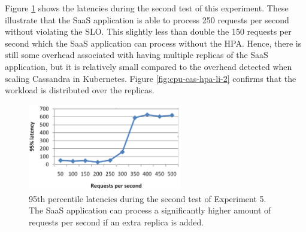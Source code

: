 \newpage

Figure \ref{fig:lat-saas-hpa-li} shows the latencies during the second test of this experiment. These illustrate that the SaaS application is able to process 250 requests per second without violating the SLO. This slightly less than double the 150 requests per second which the SaaS application can process without the HPA. Hence, there is still some overhead associated with having multiple replicas of the SaaS application, but it is relatively small compared to the overhead detected when scaling Cassandra in Kubernetes. Figure \ref{fig:cpu-cas-hpa-li-2} confirms that the workload is distributed over the replicas.

\setlength\abovecaptionskip{3pt}
\begin{figure}[h]
\centering
\includegraphics[width=0.60\textwidth]{Images/Experiments/CPU/Latencies/lat-saas-hpa-li.PNG}
\caption{95th percentile latencies during the second test of Experiment 5. The SaaS application can process a significantly higher amount of requests per second if an extra replica is added.}
\label{fig:lat-saas-hpa-li}
\end{figure}


